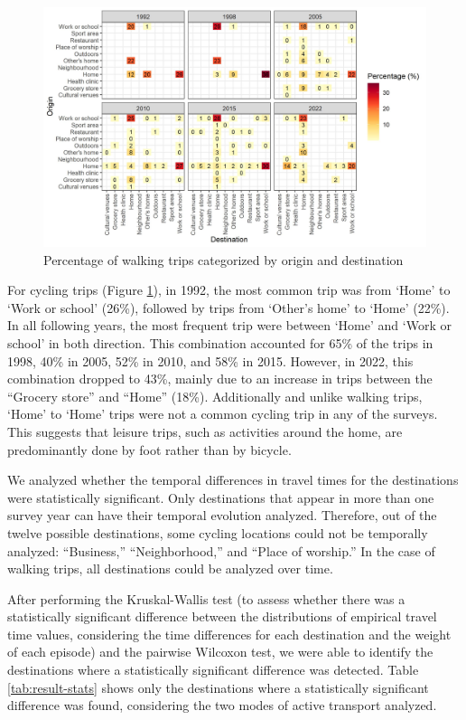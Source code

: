 \documentclass[preprint, 3p,
authoryear]{elsarticle} %
\begin{document}
\begin{figure}
\includegraphics[width=1\linewidth]{figures/cycling_hm_fig} \caption{Percentage of walking trips categorized by origin and destination}\label{fig:cycling-heatmap}
\end{figure}

For cycling trips (Figure \ref{fig:cycling-heatmap}), in 1992, the most
common trip was from `Home' to `Work or school' (26\%), followed by
trips from `Other's home' to `Home' (22\%). In all following years, the
most frequent trip were between `Home' and `Work or school' in both
direction. This combination accounted for 65\% of the trips in 1998,
40\% in 2005, 52\% in 2010, and 58\% in 2015. However, in 2022, this
combination dropped to 43\%, mainly due to an increase in trips between
the ``Grocery store'' and ``Home'' (18\%). Additionally and unlike
walking trips, `Home' to `Home' trips were not a common cycling trip in
any of the surveys. This suggests that leisure trips, such as activities
around the home, are predominantly done by foot rather than by bicycle.

We analyzed whether the temporal differences in travel times for the
destinations were statistically significant. Only destinations that
appear in more than one survey year can have their temporal evolution
analyzed. Therefore, out of the twelve possible destinations, some
cycling locations could not be temporally analyzed: ``Business,''
``Neighborhood,'' and ``Place of worship.'' In the case of walking
trips, all destinations could be analyzed over time.

After performing the Kruskal-Wallis test (to assess whether there was a
statistically significant difference between the distributions of
empirical travel time values, considering the time differences for each
destination and the weight of each episode) and the pairwise Wilcoxon
test, we were able to identify the destinations where a statistically
significant difference was detected. Table \ref{tab:result-stats} shows
only the destinations where a statistically significant difference was
found, considering the two modes of active transport analyzed.
\end{document}
